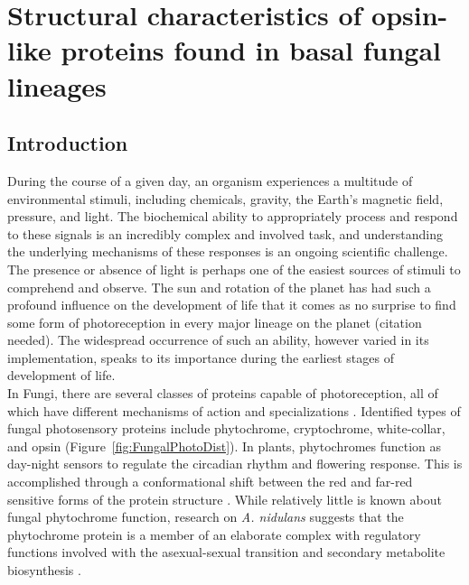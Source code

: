 \chapter{Structural characteristics of opsin-like proteins found in basal fungal lineages}
\label{chap:Rhodopsin}
\section{Introduction}
During the course of a given day, an organism experiences a multitude of environmental stimuli, including chemicals, gravity, the Earth's magnetic field, pressure, and light. The biochemical ability to appropriately process and respond to these signals is an incredibly complex and involved task, and understanding the underlying mechanisms of these responses is an ongoing scientific challenge. \\
\indent The presence or absence of light is perhaps one of the easiest sources of stimuli to comprehend and observe. The sun and rotation of the planet has had such a profound influence on the development of life that it comes as no surprise to find some form of photoreception in every major lineage on the planet (citation needed). The widespread occurrence of such an ability, however varied in its implementation, speaks to its importance during the earliest stages of development of life. \\
\indent In Fungi, there are several classes of proteins capable of photoreception, all of which have different mechanisms of action and specializations \cite{Idnurm2010}. Identified types of fungal photosensory proteins include phytochrome, cryptochrome, white-collar, and opsin \cite{Idnurm2010} (Figure~\ref{fig:FungalPhotoDist}). In plants, phytochromes function as day-night sensors to regulate the circadian rhythm and flowering response. This is accomplished through a conformational shift between the red and far-red sensitive forms of the protein structure \cite{Rockwell2006}. While relatively little is known about fungal phytochrome function, research on \textit{A. nidulans} suggests that the phytochrome protein is a member of an elaborate complex with regulatory functions involved with the asexual-sexual transition and secondary metabolite biosynthesis \cite{Idnurm2010}.\\
